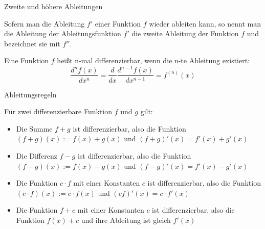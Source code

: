 \begin{frame}{Zweite und höhere Ableitungen}
	\begin{definition}
		Sofern man die Ableitung $f'$ einer Funktion $f$ wieder ableiten kann, so nennt man die Ableitung der Ableitungsfunktion $f'$ die zweite Ableitung der Funktion $f$ und bezeichnet sie mit $f''$.
		
		Eine Funktion $f$ heißt n-mal differenzierbar, wenn die n-te Ableitung existiert:
		\[
			\frac{d^{n}f(x)}{dx^{n}} = \frac{d}{dx}\frac{d^{n-1}f(x)}{dx^{n-1}} = f^{(n)}(x)
		\]
	\end{definition}
\end{frame}

\begin{frame}{Ableitungsregeln}
	\begin{theorem}
		Für zwei differenzierbare Funktion $f$ und $g$ gilt:
		\begin{itemize}
			\item Die Summe $f+g$ ist differenzierbar, also die Funktion $\left( f+g \right) (x) := f(x)+g(x)$ und $\left(f+g\right)'(x) = f'(x)+g'(x)$
			\item Die Differenz $f-g$ ist differenzierbar, also die Funktion $\left(f-g\right)(x) := f(x)-g(x)$ und $\left(f-g\right)'(x) = f'(x)-g'(x)$
			\item Die Funktion $c \cdot f$ mit einer Konstanten $c$ ist differenzierbar, also die Funktion $\left(c\cdot f\right)(x) := c\cdot f(x)$ und $\left(cf\right)'(x) = c\cdot f'(x)$				
			\item Die Funktion $f + c$ mit einer Konstanten $c$ ist differenzierbar, also die Funktion $f(x) + c$ und ihre Ableitung ist gleich $f'(x)$				
		\end{itemize}
	\end{theorem}
\end{frame}

